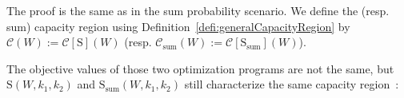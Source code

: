 The proof is the same as in the sum probability scenario. We define the (resp. sum) capacity region using Definition~\ref{defi:generalCapacityRegion} by $\mathcal{C}(W):=\mathcal{C}[\mathrm{S}](W)$ (resp. $\mathcal{C}_{\text{sum}}(W):=\mathcal{C}[{\mathrm{S}}_{\text{sum}}](W)$).

The objective values of those two optimization programs are not the same, but $\mathrm{S}(W,k_1,k_2)$ and $\mathrm{S}_{\text{sum}}(W,k_1,k_2)$ still characterize the same capacity region~\cite{Willems90}: %



